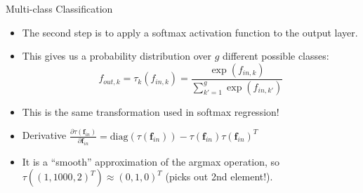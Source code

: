 \begin{frame} {Multi-class Classification}
  \begin{itemize}
    \item The second step is to apply a softmax activation function to the output layer.
    \vspace{4mm}
    \item This gives us a probability distribution over $g$ different possible classes:
    $$ f_{out,k} = \tau_k(f_{in,k}) = \frac{\exp(f_{in,k})}{\sum_{k'=1}^g\exp(f_{in,k'})}$$
    \vspace{2mm}
    \item This is the same transformation used in softmax regression!
    \vspace{4mm}
    \item Derivative $ \frac{\partial \tau(\mathbf{f}_{in})}{\partial \mathbf{f}_{in}} = \text{diag}(\tau(\mathbf{f}_{in})) - \tau(\mathbf{f}_{in}) \tau(\mathbf{f}_{in})^T $
    \vspace{4mm}
    \item It is a \enquote{smooth} approximation of the argmax operation,
        so $\tau((1, 1000, 2)^T) \approx (0, 1, 0)^T$ (picks out 2nd element!).
  \end{itemize}
\end{frame}

